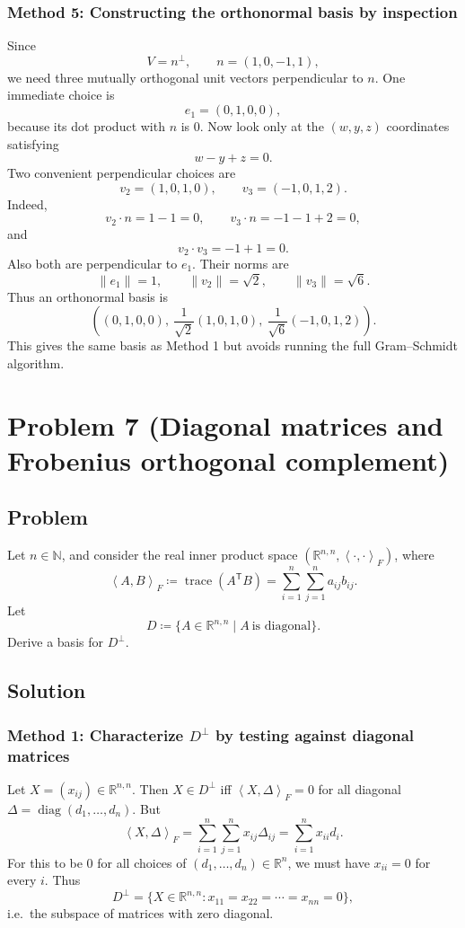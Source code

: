 \documentclass[12pt]{article}
\newcommand{\df}{\coloneqq}
\newcommand{\R}{\mathbb{R}}
\DeclareMathOperator{\tr}{trace}
\DeclareMathOperator{\diag}{diag}
\newcommand{\ip}[2]{\left\langle #1,#2\right\rangle}
\begin{document}
\subsubsection{Method 5: Constructing the orthonormal basis by inspection}
Since
\[
V=n^{\perp},
\qquad n=(1,0,-1,1),
\]
we need three mutually orthogonal unit vectors perpendicular to $n$.
One immediate choice is
\[
e_1=(0,1,0,0),
\]
because its dot product with $n$ is $0$.
Now look only at the $(w,y,z)$ coordinates satisfying
\[
w-y+z=0.
\]
Two convenient perpendicular choices are
\[
v_2=(1,0,1,0),
\qquad
v_3=(-1,0,1,2).
\]
Indeed,
\[
v_2\cdot n=1-1=0,
\qquad
v_3\cdot n=-1-1+2=0,
\]
and
\[
v_2\cdot v_3=-1+1=0.
\]
Also both are perpendicular to $e_1$. Their norms are
\[
\|e_1\|=1,
\qquad
\|v_2\|=\sqrt2,
\qquad
\|v_3\|=\sqrt6.
\]
Thus an orthonormal basis is
\[
\boxed{\,
\left(
(0,1,0,0),\ \frac{1}{\sqrt2}(1,0,1,0),\ \frac{1}{\sqrt6}(-1,0,1,2)
\right).
\,}
\]
This gives the same basis as Method 1 but avoids running the full Gram--Schmidt algorithm.


\newpage
\section{Problem 7 (Diagonal matrices and Frobenius orthogonal complement)}
\subsection{Problem}
Let $n\in\mathbb{N}$, and consider the real inner product space $(\R^{n,n},\ip{\cdot}{\cdot}_F)$, where
\[
\ip{A}{B}_F\df \tr(A^{\mathsf T}B)=\sum_{i=1}^n\sum_{j=1}^n a_{ij}b_{ij}.
\]
Let
\[
D\df \{A\in\R^{n,n}\mid A\ \text{is diagonal}\}.
\]
Derive a basis for $D^\perp$.

\subsection{Solution}

\subsubsection{Method 1: Characterize $D^\perp$ by testing against diagonal matrices}
Let $X=(x_{ij})\in\R^{n,n}$. Then $X\in D^\perp$ iff $\ip{X}{\Delta}_F=0$ for all diagonal $\Delta=\diag(d_1,\dots,d_n)$.
But
\[
\ip{X}{\Delta}_F=\sum_{i=1}^n\sum_{j=1}^n x_{ij}\Delta_{ij}=\sum_{i=1}^n x_{ii}d_i.
\]
For this to be $0$ for all choices of $(d_1,\dots,d_n)\in\R^n$, we must have $x_{ii}=0$ for every $i$.
Thus
\[
D^\perp=\{X\in\R^{n,n}: x_{11}=x_{22}=\cdots=x_{nn}=0\},
\]
i.e.\ the subspace of matrices with zero diagonal.
\end{document}
